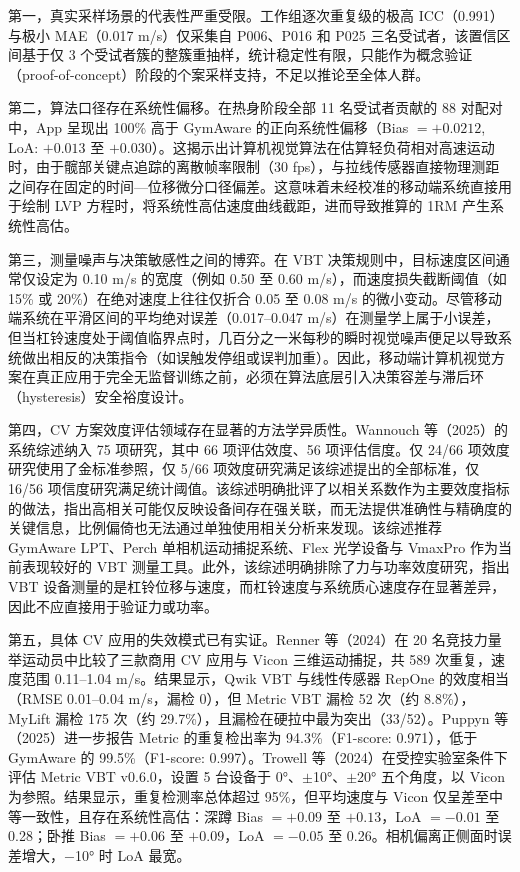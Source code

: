 \documentclass[UTF8,zihao=-4,twoside,openany]{ctexbook}
\begin{document}
第一，真实采样场景的代表性严重受限。工作组逐次重复级的极高 ICC（0.991）与极小 MAE（0.017 m/s）仅采集自 P006、P016 和 P025 三名受试者，该置信区间基于仅 3 个受试者簇的整簇重抽样，统计稳定性有限，只能作为概念验证（proof-of-concept）阶段的个案采样支持，不足以推论至全体人群。

第二，算法口径存在系统性偏移。在热身阶段全部 11 名受试者贡献的 88 对配对中，App 呈现出 100\% 高于 GymAware 的正向系统性偏移（Bias $=+0.0212$, LoA: $+0.013$ 至 $+0.030$）。这揭示出计算机视觉算法在估算轻负荷相对高速运动时，由于髋部关键点追踪的离散帧率限制（30 fps），与拉线传感器直接物理测距之间存在固定的时间—位移微分口径偏差。这意味着未经校准的移动端系统直接用于绘制 LVP 方程时，将系统性高估速度曲线截距，进而导致推算的 1RM 产生系统性高估。

第三，测量噪声与决策敏感性之间的博弈。在 VBT 决策规则中，目标速度区间通常仅设定为 0.10 m/s 的宽度（例如 0.50 至 0.60 m/s），而速度损失截断阈值（如 15\% 或 20\%）在绝对速度上往往仅折合 0.05 至 0.08 m/s 的微小变动。尽管移动端系统在平滑区间的平均绝对误差（0.017--0.047 m/s）在测量学上属于小误差，但当杠铃速度处于阈值临界点时，几百分之一米每秒的瞬时视觉噪声便足以导致系统做出相反的决策指令（如误触发停组或误判加重）。因此，移动端计算机视觉方案在真正应用于完全无监督训练之前，必须在算法底层引入决策容差与滞后环（hysteresis）安全裕度设计。

第四，CV 方案效度评估领域存在显著的方法学异质性。Wannouch 等（2025）的系统综述纳入 75 项研究，其中 66 项评估效度、56 项评估信度。仅 24/66 项效度研究使用了金标准参照，仅 5/66 项效度研究满足该综述提出的全部标准，仅 16/56 项信度研究满足统计阈值。该综述明确批评了以相关系数作为主要效度指标的做法，指出高相关可能仅反映设备间存在强关联，而无法提供准确性与精确度的关键信息，比例偏倚也无法通过单独使用相关分析来发现。该综述推荐 GymAware LPT、Perch 单相机运动捕捉系统、Flex 光学设备与 VmaxPro 作为当前表现较好的 VBT 测量工具。此外，该综述明确排除了力与功率效度研究，指出 VBT 设备测量的是杠铃位移与速度，而杠铃速度与系统质心速度存在显著差异，因此不应直接用于验证力或功率。

第五，具体 CV 应用的失效模式已有实证。Renner 等（2024）在 20 名竞技力量举运动员中比较了三款商用 CV 应用与 Vicon 三维运动捕捉，共 589 次重复，速度范围 0.11--1.04 m/s。结果显示，Qwik VBT 与线性传感器 RepOne 的效度相当（RMSE 0.01--0.04 m/s，漏检 0），但 Metric VBT 漏检 52 次（约 8.8\%），MyLift 漏检 175 次（约 29.7\%），且漏检在硬拉中最为突出（33/52）。Puppyn 等（2025）进一步报告 Metric 的重复检出率为 94.3\%（F1-score: 0.971），低于 GymAware 的 99.5\%（F1-score: 0.997）。Trowell 等（2024）在受控实验室条件下评估 Metric VBT v0.6.0，设置 5 台设备于 0°、$\pm$10°、$\pm$20° 五个角度，以 Vicon 为参照。结果显示，重复检测率总体超过 95\%，但平均速度与 Vicon 仅呈差至中等一致性，且存在系统性高估：深蹲 Bias $= +0.09$ 至 $+0.13$，LoA $= -0.01$ 至 0.28；卧推 Bias $= +0.06$ 至 $+0.09$，LoA $= -0.05$ 至 0.26。相机偏离正侧面时误差增大，$-$10° 时 LoA 最宽。
\end{document}
